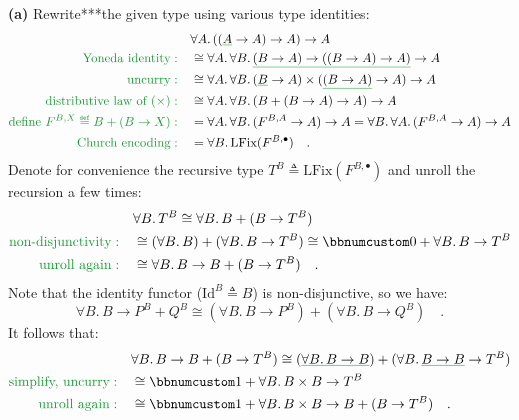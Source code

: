 \textbf{(a)} Rewrite{*}{*}{*}the given type using various type identities:
\begin{align*}
 & \forall A.\,((\gunderline A\rightarrow A)\rightarrow A)\rightarrow A\\
{\color{greenunder}\text{Yoneda identity}:}\quad & \cong\forall A.\,\forall B.\,\gunderline{(B\rightarrow A)\rightarrow((B\rightarrow A)\rightarrow A)}\rightarrow A\\
{\color{greenunder}\text{uncurry}:}\quad & \cong\forall A.\,\forall B.\,(\gunderline B\rightarrow A)\times(\gunderline{(B\rightarrow A)}\rightarrow A)\rightarrow A\\
{\color{greenunder}\text{distributive law of }(\times):}\quad & \cong\forall A.\,\forall B.\,(B+(B\rightarrow A)\rightarrow A)\rightarrow A\\
{\color{greenunder}\text{define }F^{B,X}\triangleq B+(B\rightarrow X):}\quad & =\forall A.\,\forall B.\,(F^{B,A}\rightarrow A)\rightarrow A=\forall B.\,\forall A.\,(F^{B,A}\rightarrow A)\rightarrow A\\
{\color{greenunder}\text{Church encoding}:}\quad & =\forall B.\,\text{LFix}(F^{B,\bullet})\quad.
\end{align*}
Denote for convenience the recursive type $T^{B}\triangleq\text{LFix}(F^{B,\bullet})$
and unroll the recursion a few times:
\begin{align*}
 & \forall B.\,T^{B}\cong\forall B.\,B+(B\rightarrow T^{B})\\
{\color{greenunder}\text{non-disjunctivity}:}\quad & \cong(\forall B.\,B)+(\forall B.\,B\rightarrow T^{B})\cong\bbnum 0+\forall B.\,B\rightarrow T^{B}\\
{\color{greenunder}\text{unroll again}:}\quad & \cong\forall B.\,B\rightarrow B+(B\rightarrow T^{B})\quad.
\end{align*}
Note that the identity functor ($\text{Id}^{B}\triangleq B$) is non-disjunctive,
so we have:
\[
\forall B.\,B\rightarrow P^{B}+Q^{B}\cong(\forall B.\,B\rightarrow P^{B})+(\forall B.\,B\rightarrow Q^{B})\quad.
\]
It follows that:
\begin{align*}
 & \forall B.\,B\rightarrow B+(B\rightarrow T^{B})\cong(\gunderline{\forall B.\,B\rightarrow B})+(\forall B.\,\gunderline{B\rightarrow B}\rightarrow T^{B})\\
{\color{greenunder}\text{simplify, uncurry}:}\quad & \cong\bbnum 1+\forall B.\,B\times B\rightarrow T^{B}\\
{\color{greenunder}\text{unroll again}:}\quad & \cong\bbnum 1+\forall B.\,B\times B\rightarrow B+(B\rightarrow T^{B})\quad.
\end{align*}
